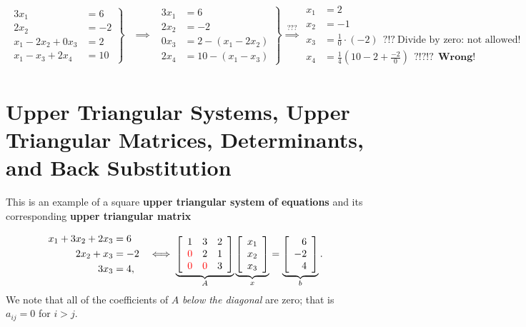 \begin{equation}
\begin{array}{ccc}
\left. \begin{aligned}
     3 x_1 &=6 \\
     2 x_2 &= -2\\
    x_1 - 2 x_2 + \boxed{ 0 x_3}&= 2 \\
    x_1 - x_3 + 2 x_4 &= 10 
    \end{aligned} \right\} & \left. \implies ~~
    \begin{aligned}
     3 x_1 &=6 \\
     2 x_2 &= -2\\
    \boxed{0 x_3}&= 2 -( x_1 - 2 x_2)\\
   2 x_4 &= 10 -( x_1 - x_3 )
    \end{aligned} \right\} \stackrel{\textbf{???}}{\implies}
    \begin{aligned}
    x_1 &=2 \\
     x_2 &= -1\\
x_3&= \boxed{\frac{1}{0}} \cdot (-2) ~~?!? ~\text{Divide by zero: not allowed!}\\
x_4 &= \frac{1}{4}(10 -2 + \frac{-2}{0})~~?!?!?~~\textbf{Wrong!}
    \end{aligned}
    \end{array}
 \end{equation}


\section{Upper Triangular Systems, Upper Triangular Matrices, Determinants, and Back Substitution}
\label{sec:BackSubstitution}
This is an example of a square \textbf{upper triangular system of equations} and its corresponding \textbf{upper triangular matrix}

\begin{equation} 
\label{eq:UT01b}
\begin{array}{cc}
    \begin{aligned}
     x_1 + 3x_2 + 2 x_3 &=6 \\
     2 x_2 +x_3 &= -2\\
     3 x_3 &= 4,
    \end{aligned} & \iff \underbrace{\left[\begin{array}{rrr} 
    1 & 3 & 2\\
\color{red} 0 & 2 & 1 \\ 
\color{red} 0 & \color{red}  0 & 3  \end{array}\right]}_{A}  
\underbrace{\left[\begin{array}{c} x_1 \\x_2 \\x_3\end{array} \right]}_{x}
= \underbrace{\left[\begin{array}{r} 6 \\-2 \\4\end{array} \right]}_{b}.
\end{array}
\end{equation}
We note that all of the coefficients of $A$ \textit{below the diagonal} are zero; that is $a_{ij}=0$ for $i > j$.\\

